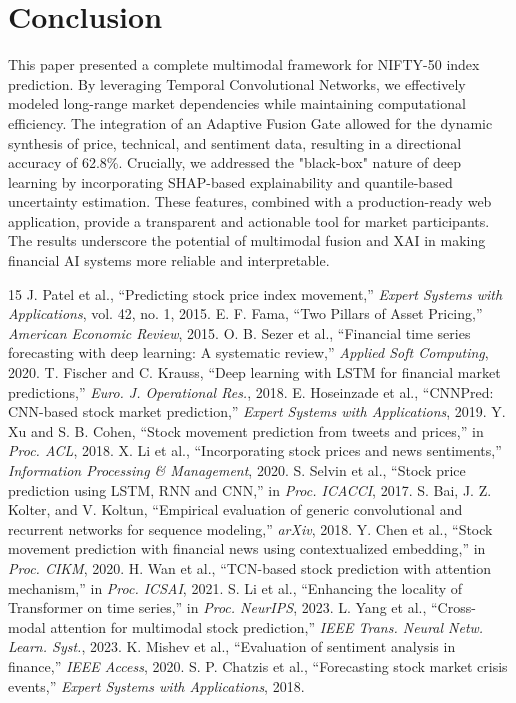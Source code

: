 \documentclass[conference]{IEEEtran}
\begin{document}
\section{Conclusion}
This paper presented a complete multimodal framework for NIFTY-50 index prediction. By leveraging Temporal Convolutional Networks, we effectively modeled long-range market dependencies while maintaining computational efficiency. The integration of an Adaptive Fusion Gate allowed for the dynamic synthesis of price, technical, and sentiment data, resulting in a directional accuracy of 62.8\%. Crucially, we addressed the "black-box" nature of deep learning by incorporating SHAP-based explainability and quantile-based uncertainty estimation. These features, combined with a production-ready web application, provide a transparent and actionable tool for market participants. The results underscore the potential of multimodal fusion and XAI in making financial AI systems more reliable and interpretable.

\begin{thebibliography}{15}
 J. Patel et al., ``Predicting stock price index movement,'' \textit{Expert Systems with Applications}, vol. 42, no. 1, 2015.
 E. F. Fama, ``Two Pillars of Asset Pricing,'' \textit{American Economic Review}, 2015.
 O. B. Sezer et al., ``Financial time series forecasting with deep learning: A systematic review,'' \textit{Applied Soft Computing}, 2020.
 T. Fischer and C. Krauss, ``Deep learning with LSTM for financial market predictions,'' \textit{Euro. J. Operational Res.}, 2018.
 E. Hoseinzade et al., ``CNNPred: CNN-based stock market prediction,'' \textit{Expert Systems with Applications}, 2019.
 Y. Xu and S. B. Cohen, ``Stock movement prediction from tweets and prices,'' in \textit{Proc. ACL}, 2018.
 X. Li et al., ``Incorporating stock prices and news sentiments,'' \textit{Information Processing \& Management}, 2020.
 S. Selvin et al., ``Stock price prediction using LSTM, RNN and CNN,'' in \textit{Proc. ICACCI}, 2017.
 S. Bai, J. Z. Kolter, and V. Koltun, ``Empirical evaluation of generic convolutional and recurrent networks for sequence modeling,'' \textit{arXiv}, 2018.
 Y. Chen et al., ``Stock movement prediction with financial news using contextualized embedding,'' in \textit{Proc. CIKM}, 2020.
 H. Wan et al., ``TCN-based stock prediction with attention mechanism,'' in \textit{Proc. ICSAI}, 2021.
 S. Li et al., ``Enhancing the locality of Transformer on time series,'' in \textit{Proc. NeurIPS}, 2023.
 L. Yang et al., ``Cross-modal attention for multimodal stock prediction,'' \textit{IEEE Trans. Neural Netw. Learn. Syst.}, 2023.
 K. Mishev et al., ``Evaluation of sentiment analysis in finance,'' \textit{IEEE Access}, 2020.
 S. P. Chatzis et al., ``Forecasting stock market crisis events,'' \textit{Expert Systems with Applications}, 2018.
\end{thebibliography}
\end{document}
